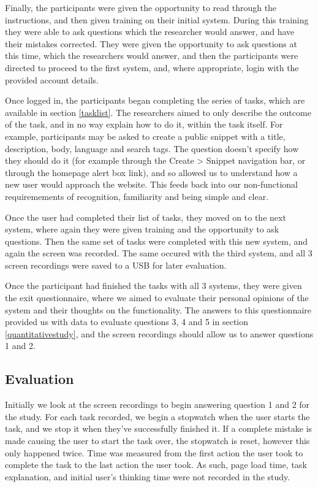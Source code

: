 Finally, the participants were given the opportunity to read through the instructions, and then given training on their initial system.
During this training they were able to ask questions which the researcher would answer, and have their mistakes corrected.
They were given the opportunity to ask questions at this time, which the researchers would answer, and then the participants were directed to proceed to the first system, and, where appropriate, login with the provided account details.

Once logged in, the participants began completing the series of tasks, which are available in section \ref{tasklist}.
The researchers aimed to only describe the outcome of the task, and in no way explain how to do it, within the task itself.
For example, participants may be asked to create a public snippet with a title, description, body, language and search tags.
The question doesn't specify how they should do it (for example through the Create > Snippet navigation bar, or through the homepage alert box link), and so allowed us to understand how a new user would approach the website. This feeds back into our non-functional requiremements of recognition, familiarity and being simple and clear.

Once the user had completed their list of tasks, they moved on to the next system, where again they were given training and the opportunity to ask questions.
Then the same set of tasks were completed with this new system, and again the screen was recorded.
The same occured with the third system, and all 3 screen recordings were saved to a USB for later evaluation.

Once the participant had finished the tasks with all 3 systems, they were given the exit questionnaire, where we aimed to evaluate their personal opinions of the system and their thoughts on the functionality.
The answers to this questionnaire provided us with data to evaluate questions 3, 4 and 5 in section \ref{quantitativestudy}, and the screen recordings should allow us to answer questions 1 and 2.


\subsection{Evaluation}
Initially we look at the screen recordings to begin answering question 1 and 2 for the study.
For each task recorded, we begin a stopwatch when the user starts the task, and we stop it when they've successfully finished it. 
If a complete mistake is made causing the user to start the task over, the stopwatch is reset, however this only happened twice.
Time was measured from the first action the user took to complete the task to the last action the user took.
As such, page load time, task explanation, and initial user's thinking time were not recorded in the study.

